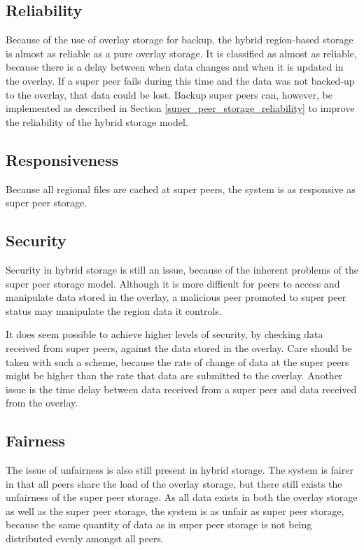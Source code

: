 \subsection{Reliability}
\label{hybrid_storage_reliability}

Because of the use of overlay storage for backup, the hybrid region-based storage is almost as reliable as a pure overlay storage. It is classified as almost as reliable, because there is a delay between when data changes and when it is updated in the overlay. If a super peer fails during this time and the data was not backed-up to the overlay, that data could be lost. Backup super peers can, however, be implemented as described in Section
\ref{super_peer_storage_reliability} to improve the reliability of the hybrid storage model.

\subsection{Responsiveness}

Because all regional files are cached at super peers, the system is as responsive as super peer storage.

\subsection{Security}

Security in hybrid storage is still an issue, because of the inherent problems of the super peer storage model. Although it is more difficult for peers to access and manipulate data stored in the overlay, a malicious peer promoted to super peer status may manipulate the region data it controls.

It does seem possible to achieve higher levels of security, by checking data received from super peers, against the data stored in the overlay. Care should be taken with such a scheme, because the rate of change of data at the super peers might be higher than the rate that data are submitted to the overlay. Another issue is the time delay between data received from a super peer and data received from the overlay.

\subsection{Fairness}

The issue of unfairness is also still present in hybrid storage. The system is fairer in that all peers share the load of the overlay storage, but there still exists the unfairness of the super peer storage. As all data exists in both the overlay storage as well as the super peer storage, the system is as unfair as super peer storage, because the same quantity of data as in super peer storage is not being distributed evenly amongst all peers.

